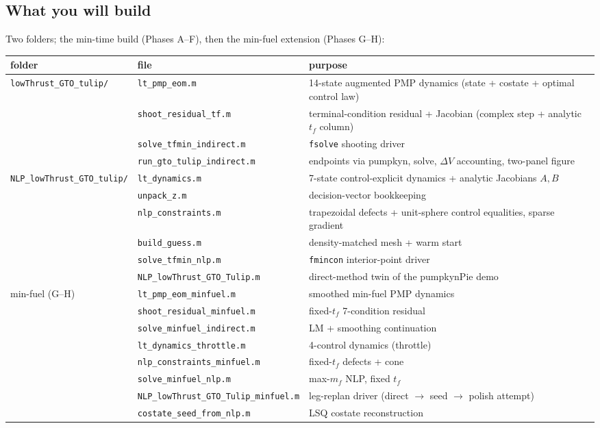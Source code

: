 \documentclass[11pt,letterpaper]{article}
\begin{document}
\subsection{What you will build}

Two folders; the min-time build (Phases A--F), then the min-fuel
extension (Phases G--H):

\begin{center}
\small
\begin{tabular}{llp{6.1cm}}
\toprule
folder & file & purpose \\
\midrule
\texttt{lowThrust\_GTO\_tulip/}
 & \texttt{lt\_pmp\_eom.m} & 14-state augmented PMP dynamics (state +
   costate + optimal control law) \\
 & \texttt{shoot\_residual\_tf.m} & terminal-condition residual + Jacobian
   (complex step + analytic $t_f$ column) \\
 & \texttt{solve\_tfmin\_indirect.m} & \texttt{fsolve} shooting driver \\
 & \texttt{run\_gto\_tulip\_indirect.m} & endpoints via pumpkyn, solve,
   $\Delta V$ accounting, two-panel figure \\
\midrule
\texttt{NLP\_lowThrust\_GTO\_tulip/}
 & \texttt{lt\_dynamics.m} & 7-state control-explicit dynamics + analytic
   Jacobians $A, B$ \\
 & \texttt{unpack\_z.m} & decision-vector bookkeeping \\
 & \texttt{nlp\_constraints.m} & trapezoidal defects + unit-sphere control
   equalities, sparse gradient \\
 & \texttt{build\_guess.m} & density-matched mesh + warm start \\
 & \texttt{solve\_tfmin\_nlp.m} & \texttt{fmincon} interior-point driver \\
 & \texttt{NLP\_lowThrust\_GTO\_Tulip.m} & direct-method twin of the
   pumpkynPie demo \\
\midrule
min-fuel (G--H)
 & \texttt{lt\_pmp\_eom\_minfuel.m} & smoothed min-fuel PMP dynamics \\
 & \texttt{shoot\_residual\_minfuel.m} & fixed-$t_f$ 7-condition residual \\
 & \texttt{solve\_minfuel\_indirect.m} & LM + smoothing continuation \\
 & \texttt{lt\_dynamics\_throttle.m} & 4-control dynamics (throttle) \\
 & \texttt{nlp\_constraints\_minfuel.m} & fixed-$t_f$ defects + cone \\
 & \texttt{solve\_minfuel\_nlp.m} & max-$m_f$ NLP, fixed $t_f$ \\
 & \texttt{NLP\_lowThrust\_GTO\_Tulip\_minfuel.m} & leg-replan driver
   (direct $\to$ seed $\to$ polish attempt) \\
 & \texttt{costate\_seed\_from\_nlp.m} & LSQ costate reconstruction \\
\bottomrule
\end{tabular}
\end{center}
\end{document}
